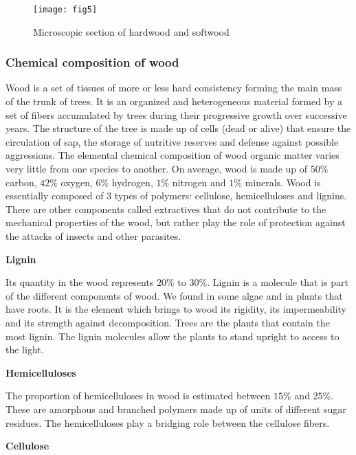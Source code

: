 \begin{figure}[htp]
	\centering
	\texttt{[image: fig5]}
	\caption{Microscopic section of hardwood and softwood \cite{Thibaut2015phd}}
	\label{fig:fig5}
\end{figure}

\subsubsection{Chemical composition of wood}

Wood is a set of tissues of more or less hard consistency forming the main mass of the trunk of trees. It is an organized and heterogeneous material formed by a set of fibers accumulated by trees during their progressive growth over successive years. The structure of the tree is made up of cells (dead or alive) that ensure the circulation of sap, the storage of nutritive reserves and defense against possible aggressions.
The elemental chemical composition of wood organic matter varies very little from one species to another. On average, wood is made up of $50 \%$ carbon, $42 \%$ oxygen, $6 \%$ hydrogen, $1 \%$ nitrogen and $1 \%$ minerals. Wood is essentially composed of 3 types of polymers: cellulose, hemicelluloses and lignins. There are other components called extractives that do not contribute to the mechanical properties of the wood, but rather play the role of protection against the attacks of insects and other parasites.

\smallskip

\textbf{Lignin}

Its quantity in the wood represents $20 \%$ to $30 \%$. Lignin is a molecule that is part of the different components of wood. We found in some algae and in plants that have roots. It is the element which brings to wood its rigidity, its impermeability and its strength against decomposition. Trees are the plants that contain the most lignin. The lignin molecules allow the plants to stand upright to access to the light.

\smallskip

\textbf{Hemicelluloses}

The proportion of hemicelluloses in wood is estimated between $15 \%$ and $25 \%$. These are amorphous and branched polymers made up of units of different sugar residues. The hemicelluloses play a bridging role between the cellulose fibers.

\smallskip

\textbf{Cellulose}

